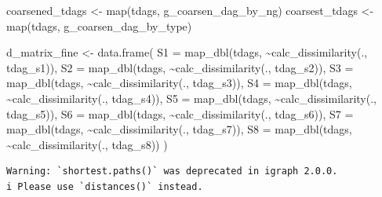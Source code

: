 \documentclass[
  letterpaper,
  DIV=11,
  numbers=noendperiod]{scrartcl}
\newenvironment{Shaded}{\begin{snugshade}}{\end{snugshade}}
\newcommand{\AttributeTok}[1]{\textcolor[rgb]{0.40,0.45,0.13}{#1}}
\newcommand{\FunctionTok}[1]{\textcolor[rgb]{0.28,0.35,0.67}{#1}}
\newcommand{\NormalTok}[1]{\textcolor[rgb]{0.00,0.23,0.31}{#1}}
\newcommand{\OtherTok}[1]{\textcolor[rgb]{0.00,0.23,0.31}{#1}}
\newcommand{\SpecialCharTok}[1]{\textcolor[rgb]{0.37,0.37,0.37}{#1}}
\begin{document}
\begin{Shaded}
\begin{Highlighting}[]
\NormalTok{coarsened\_tdags }\OtherTok{\textless{}{-}} \FunctionTok{map}\NormalTok{(tdags, g\_coarsen\_dag\_by\_ng)}
\NormalTok{coarsest\_tdags }\OtherTok{\textless{}{-}} \FunctionTok{map}\NormalTok{(tdags, g\_coarsen\_dag\_by\_type)}

\NormalTok{d\_matrix\_fine }\OtherTok{\textless{}{-}}  
    \FunctionTok{data.frame}\NormalTok{(}
        \AttributeTok{S1 =} \FunctionTok{map\_dbl}\NormalTok{(tdags, }\SpecialCharTok{\textasciitilde{}}\FunctionTok{calc\_dissimilarity}\NormalTok{(., tdag\_s1)),}
        \AttributeTok{S2 =} \FunctionTok{map\_dbl}\NormalTok{(tdags, }\SpecialCharTok{\textasciitilde{}}\FunctionTok{calc\_dissimilarity}\NormalTok{(., tdag\_s2)),}
        \AttributeTok{S3 =} \FunctionTok{map\_dbl}\NormalTok{(tdags, }\SpecialCharTok{\textasciitilde{}}\FunctionTok{calc\_dissimilarity}\NormalTok{(., tdag\_s3)),}
        \AttributeTok{S4 =} \FunctionTok{map\_dbl}\NormalTok{(tdags, }\SpecialCharTok{\textasciitilde{}}\FunctionTok{calc\_dissimilarity}\NormalTok{(., tdag\_s4)),}
        \AttributeTok{S5 =} \FunctionTok{map\_dbl}\NormalTok{(tdags, }\SpecialCharTok{\textasciitilde{}}\FunctionTok{calc\_dissimilarity}\NormalTok{(., tdag\_s5)),}
        \AttributeTok{S6 =} \FunctionTok{map\_dbl}\NormalTok{(tdags, }\SpecialCharTok{\textasciitilde{}}\FunctionTok{calc\_dissimilarity}\NormalTok{(., tdag\_s6)),}
        \AttributeTok{S7 =} \FunctionTok{map\_dbl}\NormalTok{(tdags, }\SpecialCharTok{\textasciitilde{}}\FunctionTok{calc\_dissimilarity}\NormalTok{(., tdag\_s7)),}
        \AttributeTok{S8 =} \FunctionTok{map\_dbl}\NormalTok{(tdags, }\SpecialCharTok{\textasciitilde{}}\FunctionTok{calc\_dissimilarity}\NormalTok{(., tdag\_s8))}
\NormalTok{        )}
\end{Highlighting}
\end{Shaded}

\begin{verbatim}
Warning: `shortest.paths()` was deprecated in igraph 2.0.0.
i Please use `distances()` instead.
\end{verbatim}
\end{document}
